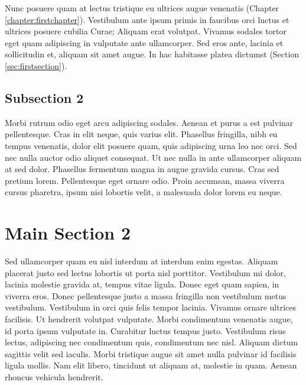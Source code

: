 Nunc posuere quam at lectus tristique eu ultrices augue venenatis (Chapter \ref{chapter:firstchapter}).
Vestibulum ante ipsum primis in faucibus orci luctus et ultrices posuere cubilia Curae; Aliquam erat volutpat.
Vivamus sodales tortor eget quam adipiscing in vulputate ante ullamcorper.
Sed eros ante, lacinia et sollicitudin et, aliquam sit amet augue.
In hac habitasse platea dictumst (Section \ref{sec:firstsection}).


\subsection{Subsection 2}
Morbi rutrum odio eget arcu adipiscing sodales.
Aenean et purus a est pulvinar pellentesque.
 Cras in elit neque, quis varius elit.
 Phasellus fringilla, nibh eu tempus venenatis, dolor elit posuere quam, quis adipiscing urna leo nec orci.
 Sed nec nulla auctor odio aliquet consequat.
 Ut nec nulla in ante ullamcorper aliquam at sed dolor.
 Phasellus fermentum magna in augue gravida cursus.
 Cras sed pretium lorem.
 Pellentesque eget ornare odio.
 Proin accumsan, massa viverra cursus pharetra, ipsum nisi lobortis velit, a malesuada dolor lorem eu neque.


\section{Main Section 2}

Sed ullamcorper quam eu nisl interdum at interdum enim egestas.
 Aliquam placerat justo sed lectus lobortis ut porta nisl porttitor.
 Vestibulum mi dolor, lacinia molestie gravida at, tempus vitae ligula.
 Donec eget quam sapien, in viverra eros.
 Donec pellentesque justo a massa fringilla non vestibulum metus vestibulum.
 Vestibulum in orci quis felis tempor lacinia.
 Vivamus ornare ultrices facilisis.
 Ut hendrerit volutpat vulputate.
 Morbi condimentum venenatis augue, id porta ipsum vulputate in.
 Curabitur luctus tempus justo.
 Vestibulum risus lectus, adipiscing nec condimentum quis, condimentum nec nisl.
 Aliquam dictum sagittis velit sed iaculis.
 Morbi tristique augue sit amet nulla pulvinar id facilisis ligula mollis.
 Nam elit libero, tincidunt ut aliquam at, molestie in quam.
 Aenean rhoncus vehicula hendrerit.
